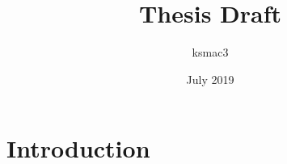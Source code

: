 \documentclass{article}
\title{Thesis Draft}
\author{ksmac3 }
\date{July 2019}
\begin{document}
\maketitle

\section{Introduction}
\end{document}
